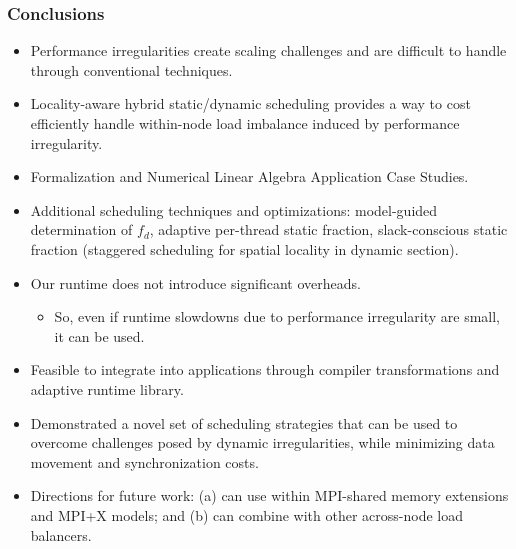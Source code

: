 \begin{frame}[label=conclusions]
  \frametitle{Conclusions}
  \begin{itemize}
  \item \small Performance irregularities create scaling challenges
    and are difficult to handle through conventional techniques. 
  \item \small Locality-aware hybrid static/dynamic scheduling
    provides a way to cost efficiently handle within-node 
    load imbalance induced by performance irregularity. 
  \item \small Formalization and Numerical Linear Algebra Application
    Case Studies. 
  \item \small Additional scheduling techniques and optimizations:
    model-guided determination of $f_d$, adaptive per-thread static fraction, slack-conscious static
    fraction (staggered scheduling for spatial locality in dynamic
    section). 
  \item \small Our runtime does not introduce significant overheads. 
\begin{itemize} 
  \item \small So, even if runtime slowdowns due to performance
    irregularity are small, it can be used.
\end{itemize}  
  \item \small Feasible to integrate into applications through
    compiler transformations and adaptive runtime library. 
  \item \small Demonstrated a novel set of scheduling strategies that
    can be used to overcome challenges posed by dynamic
    irregularities, while minimizing data movement and synchronization
    costs. 
\item \small Directions for future work: (a) can use within MPI-shared memory extensions and
  MPI+X models; and (b) can combine with other across-node load balancers.
  \end{itemize}
\end{frame}

%

%
% 
